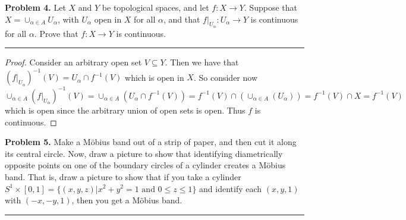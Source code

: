 \documentclass[leqno]{article}
\theoremstyle{nonumberplain}
\newtheorem{proof}{Proof}
\begin{document}
\pagebreak





\noindent\textbf{Problem 4.}  Let $X$ and $Y$ be topological spaces, and let $f\colon X \to Y$. Suppose that $X=\cup_{\alpha \in A} U_\alpha$, with $U_\alpha$ open in $X$ for all $\alpha$, and that $f\vert_{U_\alpha} \colon U_\alpha \to Y$ is continuous for all $\alpha$. Prove that $f\colon X \to Y$ is continuous.

\noindent\rule[0.5ex]{\linewidth}{1pt}

\begin{proof}
Consider an arbitrary open set $V\subseteq Y$.  Then we have that $(f\vert_{U_\alpha})^{-1}(V)=U_\alpha\cap f^{-1}(V)$ which is open in $X$.  So consider now $\cup_{\alpha \in A} (f\vert_{U_\alpha})^{-1}(V)=\cup_{\alpha \in A} (U_\alpha \cap f^{-1}(V)) = f^{-1}(V)\cap (\cup_{\alpha \in A}(U_\alpha))=f^{-1}(V)\cap X=f^{-1}(V)$ which is open since the arbitrary union of open sets is open.  Thus $f$ is continuous.
\end{proof}


\pagebreak



\noindent\textbf{Problem 5.}  Make a M{\"o}bius band out of a strip of paper, and then cut it along its central circle. Now, draw a picture to show that identifying diametrically opposite points on one of the boundary circles of a cylinder creates a M{\"o}bius band. That is, draw a picture to show that if you take a cylinder $S^1 \times [0,1]=\{(x,y,z)\vert x^2+y^2=1 \textrm{ and } 0\leq z\leq 1\}$ and identify each $(x,y,1)$ with $(-x,-y,1)$, then you get a M{\"o}bius band.

\noindent\rule[0.5ex]{\linewidth}{1pt}
\end{document}
